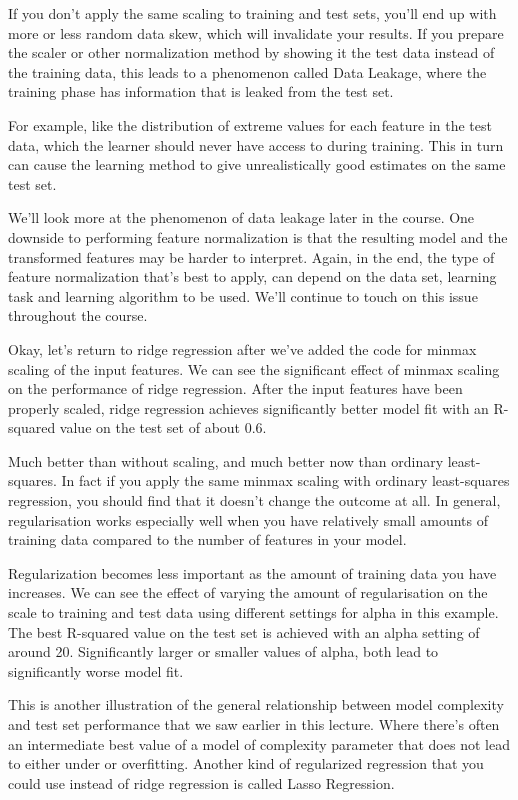 \begin{multicols}{2}
If you don't apply the same scaling to training and test sets, you'll end up with more or less random data skew, which will invalidate your results. If you prepare the scaler or other normalization method by showing it the test data instead of the training data, this leads to a phenomenon called Data Leakage, where the training phase has information that is leaked from the test set. 

For example, like the distribution of extreme values for each feature in the test data, which the learner should never have access to during training. This in turn can cause the learning method to give unrealistically good estimates on the same test set. 

We'll look more at the phenomenon of data leakage later in the course. One downside to performing feature normalization is that the resulting model and the transformed features may be harder to interpret. Again, in the end, the type of feature normalization that's best to apply, can depend on the data set, learning task and learning algorithm to be used. We'll continue to touch on this issue throughout the course. 

Okay, let's return to ridge regression after we've added the code for minmax scaling of the input features. We can see the significant effect of minmax scaling on the performance of ridge regression. After the input features have been properly scaled, ridge regression achieves significantly better model fit with an R-squared value on the test set of about 0.6. 

Much better than without scaling, and much better now than ordinary least-squares. In fact if you apply the same minmax scaling with ordinary least-squares regression, you should find that it doesn't change the outcome at all. In general, regularisation works especially well when you have relatively small amounts of training data compared to the number of features in your model. 

Regularization becomes less important as the amount of training data you have increases. We can see the effect of varying the amount of regularisation on the scale to training and test data using different settings for alpha in this example. The best R-squared value on the test set is achieved with an alpha setting of around 20. Significantly larger or smaller values of alpha, both lead to significantly worse model fit. 

This is another illustration of the general relationship between model complexity and test set performance that we saw earlier in this lecture. Where there's often an intermediate best value of a model of complexity parameter that does not lead to either under or overfitting. Another kind of regularized regression that you could use instead of ridge regression is called Lasso Regression. 


\end{multicols}
